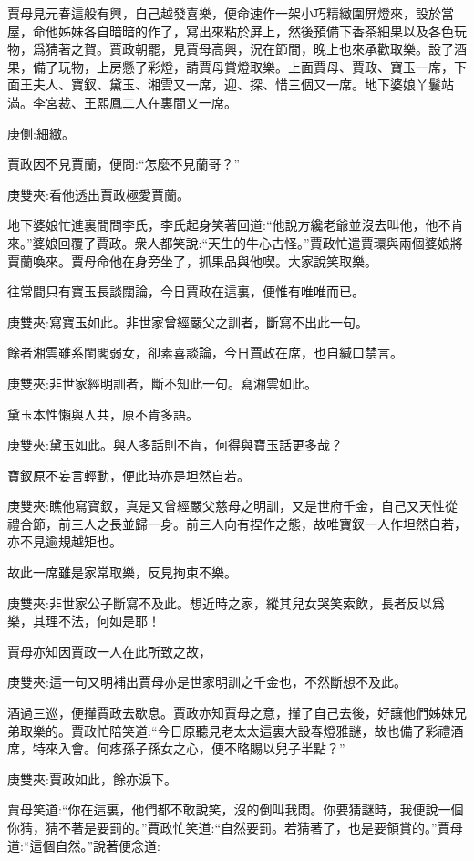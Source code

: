 \begin{parag}
    賈母見元春這般有興，自己越發喜樂，便命速作一架小巧精緻圍屏燈來，設於當屋，命他姊妹各自暗暗的作了，寫出來粘於屏上，然後預備下香茶細果以及各色玩物，爲猜著之賀。賈政朝罷，見賈母高興，況在節間，晚上也來承歡取樂。設了酒果，備了玩物，上房懸了彩燈，請賈母賞燈取樂。上面賈母、賈政、寶玉一席，下面王夫人、寶釵、黛玉、湘雲又一席，迎、探、惜三個又一席。地下婆娘丫鬟站滿。李宮裁、王熙鳳二人在裏間又一席。\begin{note}庚側:細緻。\end{note}賈政因不見賈蘭，便問:“怎麼不見蘭哥？”\begin{note}庚雙夾:看他透出賈政極愛賈蘭。\end{note}地下婆娘忙進裏間問李氏，李氏起身笑著回道:“他說方纔老爺並沒去叫他，他不肯來。”婆娘回覆了賈政。衆人都笑說:“天生的牛心古怪。”賈政忙遣賈環與兩個婆娘將賈蘭喚來。賈母命他在身旁坐了，抓果品與他喫。大家說笑取樂。
\end{parag}


\begin{parag}
    往常間只有寶玉長談闊論，今日賈政在這裏，便惟有唯唯而已。\begin{note}庚雙夾:寫寶玉如此。非世家曾經嚴父之訓者，斷寫不出此一句。\end{note}餘者湘雲雖系閨閣弱女，卻素喜談論，今日賈政在席，也自緘口禁言。\begin{note}庚雙夾:非世家經明訓者，斷不知此一句。寫湘雲如此。\end{note}黛玉本性懶與人共，原不肯多語。\begin{note}庚雙夾:黛玉如此。與人多話則不肯，何得與寶玉話更多哉？\end{note}寶釵原不妄言輕動，便此時亦是坦然自若。\begin{note}庚雙夾:瞧他寫寶釵，真是又曾經嚴父慈母之明訓，又是世府千金，自己又天性從禮合節，前三人之長並歸一身。前三人向有捏作之態，故唯寶釵一人作坦然自若，亦不見逾規越矩也。\end{note}故此一席雖是家常取樂，反見拘束不樂。\begin{note}庚雙夾:非世家公子斷寫不及此。想近時之家，縱其兒女哭笑索飲，長者反以爲樂，其理不法，何如是耶！\end{note}賈母亦知因賈政一人在此所致之故，\begin{note}庚雙夾:這一句又明補出賈母亦是世家明訓之千金也，不然斷想不及此。\end{note}酒過三巡，便攆賈政去歇息。賈政亦知賈母之意，攆了自己去後，好讓他們姊妹兄弟取樂的。賈政忙陪笑道:“今日原聽見老太太這裏大設春燈雅謎，故也備了彩禮酒席，特來入會。何疼孫子孫女之心，便不略賜以兒子半點？”\begin{note}庚雙夾:賈政如此，餘亦淚下。\end{note}賈母笑道:“你在這裏，他們都不敢說笑，沒的倒叫我悶。你要猜謎時，我便說一個你猜，猜不著是要罰的。”賈政忙笑道:“自然要罰。若猜著了，也是要領賞的。”賈母道:“這個自然。”說著便念道:
\end{parag}


